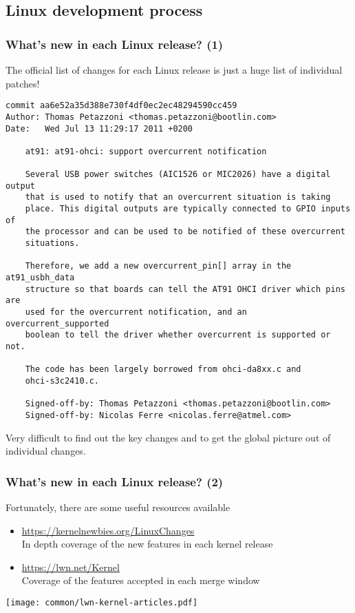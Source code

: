 \subsection{Linux development process}

\begin{frame}[fragile]
  \frametitle{What's new in each Linux release? (1)}
  The official list of changes for each Linux release is just a
  huge list of individual patches!
\Tiny
    \begin{verbatim}
commit aa6e52a35d388e730f4df0ec2ec48294590cc459
Author: Thomas Petazzoni <thomas.petazzoni@bootlin.com>
Date:   Wed Jul 13 11:29:17 2011 +0200

    at91: at91-ohci: support overcurrent notification

    Several USB power switches (AIC1526 or MIC2026) have a digital output
    that is used to notify that an overcurrent situation is taking
    place. This digital outputs are typically connected to GPIO inputs of
    the processor and can be used to be notified of these overcurrent
    situations.

    Therefore, we add a new overcurrent_pin[] array in the at91_usbh_data
    structure so that boards can tell the AT91 OHCI driver which pins are
    used for the overcurrent notification, and an overcurrent_supported
    boolean to tell the driver whether overcurrent is supported or not.

    The code has been largely borrowed from ohci-da8xx.c and
    ohci-s3c2410.c.

    Signed-off-by: Thomas Petazzoni <thomas.petazzoni@bootlin.com>
    Signed-off-by: Nicolas Ferre <nicolas.ferre@atmel.com>
\end{verbatim}
\normalsize
  Very difficult to find out the key changes and to get the
  global picture out of individual changes.
\end{frame}

\begin{frame}
  \frametitle{What's new in each Linux release? (2)}
  Fortunately, there are some useful resources available
  \begin{itemize}
    \item \url{https://kernelnewbies.org/LinuxChanges}\\
	In depth coverage of the new features in each kernel release
    \item \url{https://lwn.net/Kernel}\\
	Coverage of the features accepted in each merge window
  \end{itemize}
  \begin{center}
    \texttt{[image: common/lwn-kernel-articles.pdf]}
  \end{center}
\end{frame}
